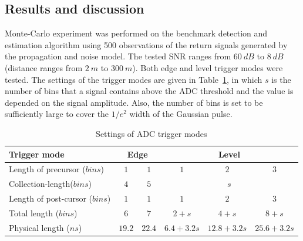 \subsection{Results and discussion} \label{sec:bm_result}
Monte-Carlo experiment was performed on the benchmark detection and estimation algorithm using 500 observations of the return signals generated by the propagation and noise model. The tested SNR ranges from $60~dB$ to $8~dB$ (distance ranges from $2~m$ to $300~m$). Both edge and level trigger modes were tested. The settings of the trigger modes are given in Table~\ref{table:ADCtrigger}, in which $s$ is the number of bins that a signal contains above the ADC threshold and the value is depended on the signal amplitude. Also, the number of bins is set to be sufficiently large to cover the $1/e^2$ width of the Gaussian pulse. 
\begin{table}[h]
\centering 
\caption{Settings of ADC trigger modes}
\label{table:ADCtrigger}
\begin{tabular}{|l|c|c|c|c|c|}
\hline
Trigger mode            & \multicolumn{2}{c|}{Edge} & \multicolumn{3}{c|}{Level}                \\ \hline
Length of precursor ($bins$)        & $1$           & $1$           & $1$           & $2$            & $3$            \\ \hline
Collection-length($bins$) & $4$           & $5$           & \multicolumn{3}{c|}{$s$}                  \\ \hline
Length of post-cursor ($bins$)     & $1$           & $1$           & $1$           & $2$            & $3$            \\ \hline
Total length ($bins$)     & $6$           & $7$           & $2+s$       & $4+s$        & $8+s$        \\ \hline
Physical length ($ns$)    & $19.2$        & $22.4$        & $6.4+3.2s$ & $12.8+3.2s$ & $25.6+3.2s$ \\ \hline
\end{tabular}
\end{table}
